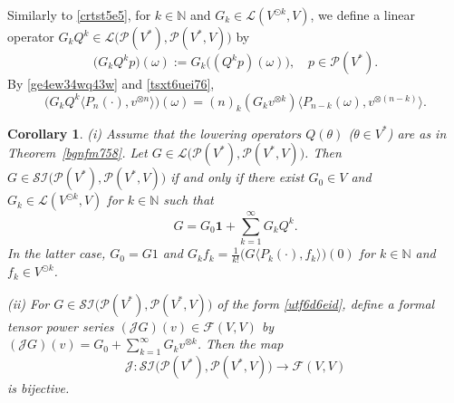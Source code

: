 \documentclass[12pt]{article}
\newtheorem{corollary}[theorem]{Corollary}
\theoremstyle{remark}
\theoremstyle{remark}
\theoremstyle{remark}
\begin{document}
Similarly to \eqref{crtst5e5}, for $k\in\mathbb N$ and 
 $G_k\in\mathcal L(V^{\odot k},V)$, we define a linear operator $ G_kQ^{k}\in \mathcal L\big(\mathcal P(V^*),\mathcal P(V^*,V)\big)$ by 
\begin{equation}\label{tsxt6uei76}
 \big(G_kQ^{k} p\big)(\omega):=  G_k\big((Q^{k}p)(\omega)\big),\quad p\in\mathcal P(V^*).
 \end{equation}
By \eqref{ge4ew34wq43w} and \eqref{tsxt6uei76},
\begin{equation}\label{dzsrea4ywu565468l}
\big(G_kQ^k\langle P_n(\cdot),v^{\otimes n}\rangle\big)(\omega)=(n)_k(G_kv^{\otimes k})\langle P_{n-k}(\omega),v^{\otimes(n-k)}\rangle. 
\end{equation}


\begin{corollary}\label{xesa4aq46q327y} 
{\rm (i)} Assume that the  lowering operators $Q(\theta)$  ($\theta\in V^*$) are as in Theorem~\ref{bgnfm758}.  Let $G \in \mathcal L\big(\mathcal P  (V^*),\mathcal P  (V^*,V)\big)$. Then  $G\in\mathcal{SI}\big(\mathcal P  (V^*),\mathcal P(V^*,V)\big)$ if and only if there exist $G_0\in V$ and $G_k\in \mathcal L(V^{\odot k},V)$ for $k\in \mathbb N$ such that
\begin{equation}\label{utf6d6eid}
G=G_0\mathbf 1+\sum_{k=1}^\infty G_k
Q^{k}.\end{equation}
In the latter case,  
$G_0=G 1$ and $ G_k f_k  =\frac1{k!}\big(G\langle P_k(\cdot),f_k\rangle\big)(0)$ for $k\in\mathbb N$ and $f_k\in V^{\odot   k}$.

{\rm (ii)} For   $G\in\mathcal{SI}\big(\mathcal P  (V^*),\mathcal P(V^*,V)\big)$ of the form \eqref{utf6d6eid}, define a formal tensor power series $(\mathcal JG)(v)\in \mathcal F(V,V)$ by
$(\mathcal JG)(v)=G_0+\sum_{k=1}^\infty G_kv^{\otimes k}$.
Then the map
$$\mathcal J:\mathcal{SI}\big(\mathcal P  (V^*),\mathcal P(V^*,V)\big)\to \mathcal F(V,V)$$
 is bijective.
\end{corollary}
\end{document}
